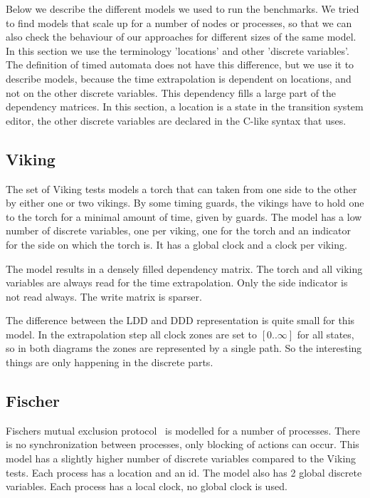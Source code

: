 Below we describe the different models we used to run the benchmarks. We tried to find models that scale up for a number of nodes or processes, so that we can also check the behaviour of our approaches for different sizes of the same model. In this section we use the terminology 'locations' and other 'discrete variables'. The definition of timed automata does not have this difference, but we use it to describe models, because the time extrapolation is dependent on locations, and not on the other discrete variables. This dependency fills a large part of the dependency matrices. In this section, a location is a state in the \uppaal{} transition system editor, the other discrete variables are declared in the C-like syntax that \uppaal{} uses.

\subsection{Viking}
The set of Viking tests models a torch that can taken from one side to the other by either one or two vikings. By some timing guards, the vikings have to hold one to the torch for a minimal amount of time, given by guards. The model has a low number of discrete variables, one per viking, one for the torch and an indicator for the side on which the torch is. It has a global clock and a clock per viking. 

The model results in a densely filled dependency matrix. The torch and all viking variables are always read for the time extrapolation. Only the side indicator is not read always. The write matrix is sparser. 

The difference between the LDD and DDD representation is quite small for this model. In the extrapolation step all clock zones are set to $[0..\infty]$ for all states, so in both diagrams the zones are represented by a single path. So the interesting things are only happening in the discrete parts.

\subsection{Fischer}
Fischers mutual exclusion protocol~\cite{Lamport:1987:FME:7351.7352} is modelled for a number of processes. There is no synchronization between processes, only blocking of actions can occur. This model has a slightly higher number of discrete variables compared to the Viking tests. Each process has a location and an id. The model also has 2 global discrete variables. Each process has a local clock, no global clock is used.

